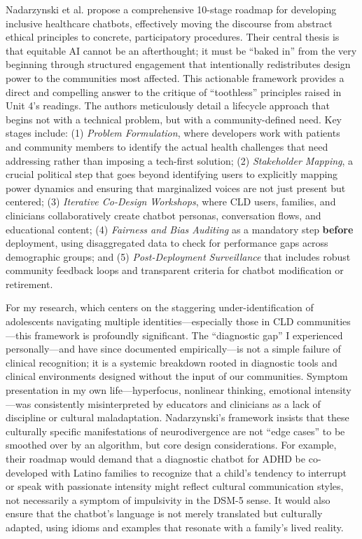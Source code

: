 \documentclass[11pt,twoside]{article}
\begin{document}
\vspace{-0.3cm}
Nadarzynski et al. propose a comprehensive 10-stage roadmap for developing inclusive healthcare chatbots, effectively moving the discourse from abstract ethical principles to concrete, participatory procedures. Their central thesis is that equitable AI cannot be an afterthought; it must be “baked in” from the very beginning through structured engagement that intentionally redistributes design power to the communities most affected. This actionable framework provides a direct and compelling answer to the critique of “toothless” principles raised in Unit 4’s readings. The authors meticulously detail a lifecycle approach that begins not with a technical problem, but with a community-defined need. Key stages include: (1) \textit{Problem Formulation}, where developers work with patients and community members to identify the actual health challenges that need addressing rather than imposing a tech-first solution; (2) \textit{Stakeholder Mapping}, a crucial political step that goes beyond identifying users to explicitly mapping power dynamics and ensuring that marginalized voices are not just present but centered; (3) \textit{Iterative Co-Design Workshops}, where CLD users, families, and clinicians collaboratively create chatbot personas, conversation flows, and educational content; (4) \textit{Fairness and Bias Auditing} as a mandatory step \textbf{before} deployment, using disaggregated data to check for performance gaps across demographic groups; and (5) \textit{Post-Deployment Surveillance} that includes robust community feedback loops and transparent criteria for chatbot modification or retirement.

For my research, which centers on the staggering under-identification of adolescents navigating multiple identities—especially those in CLD communities—this framework is profoundly significant. The “diagnostic gap” I experienced personally—and have since documented empirically—is not a simple failure of clinical recognition; it is a systemic breakdown rooted in diagnostic tools and clinical environments designed without the input of our communities. Symptom presentation in my own life—hyperfocus, nonlinear thinking, emotional intensity—was consistently misinterpreted by educators and clinicians as a lack of discipline or cultural maladaptation. Nadarzynski’s framework insists that these culturally specific manifestations of neurodivergence are not “edge cases” to be smoothed over by an algorithm, but core design considerations. For example, their roadmap would demand that a diagnostic chatbot for ADHD be co-developed with Latino families to recognize that a child’s tendency to interrupt or speak with passionate intensity might reflect cultural communication styles, not necessarily a symptom of impulsivity in the DSM-5 sense. It would also ensure that the chatbot’s language is not merely translated but culturally adapted, using idioms and examples that resonate with a family’s lived reality.
\end{document}
